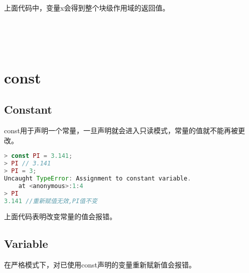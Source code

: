 上面代码中，变量x会得到整个块级作用域的返回值。


\begin{lstlisting}[language=JavaScript]

\end{lstlisting}


\begin{lstlisting}[language=JavaScript]

\end{lstlisting}




\begin{lstlisting}[language=JavaScript]

\end{lstlisting}


\begin{lstlisting}[language=JavaScript]

\end{lstlisting}




\begin{lstlisting}[language=JavaScript]

\end{lstlisting}


\section{const}


\subsection{Constant}



const用于声明一个常量，一旦声明就会进入只读模式，常量的值就不能再被更改。


\begin{lstlisting}[language=JavaScript]
> const PI = 3.141;
> PI // 3.141
> PI = 3; 
Uncaught TypeError: Assignment to constant variable.
    at <anonymous>:1:4
> PI
3.141 //重新赋值无效,PI值不变
\end{lstlisting}

上面代码表明改变常量的值会报错。


\subsection{Variable}


在严格模式下，对已使用const声明的变量重新赋新值会报错。

